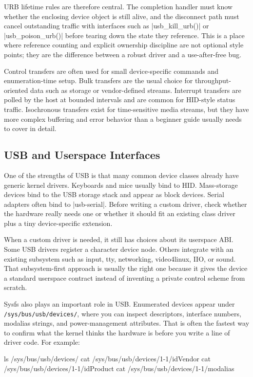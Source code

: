 \documentclass[10pt, oneside]{book}
\begin{document}
URB lifetime rules are therefore central.
The completion handler must know whether the enclosing device object is still
alive, and the disconnect path must cancel outstanding traffic with interfaces
such as \cpp|usb_kill_urb()| or \cpp|usb_poison_urb()| before tearing down the
state they reference.
This is a place where reference counting and explicit ownership discipline are
not optional style points; they are the difference between a robust driver and a
use-after-free bug.

Control transfers are often used for small device-specific commands and
enumeration-time setup.
Bulk transfers are the usual choice for throughput-oriented data such as storage
or vendor-defined streams.
Interrupt transfers are polled by the host at bounded intervals and are common
for HID-style status traffic.
Isochronous transfers exist for time-sensitive media streams, but they have more
complex buffering and error behavior than a beginner guide usually needs to
cover in detail.

\subsection{USB and Userspace Interfaces}
\label{sec:usb_userspace}
One of the strengths of USB is that many common device classes already have
generic kernel drivers.
Keyboards and mice usually bind to HID.
Mass-storage devices bind to the USB storage stack and appear as block devices.
Serial adapters often bind to \cpp|usb-serial|.
Before writing a custom driver, check whether the hardware really needs one or
whether it should fit an existing class driver plus a tiny device-specific
extension.

When a custom driver is needed, it still has choices about its userspace ABI.
Some USB drivers register a character device node.
Others integrate with an existing subsystem such as input, tty, networking,
video4linux, IIO, or sound.
That subsystem-first approach is usually the right one because it gives the
device a standard userspace contract instead of inventing a private control
scheme from scratch.

Sysfs also plays an important role in USB.
Enumerated devices appear under \verb|/sys/bus/usb/devices/|, where you can
inspect descriptors, interface numbers, modalias strings, and power-management
attributes.
That is often the fastest way to confirm what the kernel thinks the hardware is
before you write a line of driver code.
For example:
\begin{codebash}
ls /sys/bus/usb/devices/
cat /sys/bus/usb/devices/1-1/idVendor
cat /sys/bus/usb/devices/1-1/idProduct
cat /sys/bus/usb/devices/1-1/modalias
\end{codebash}
\end{document}
